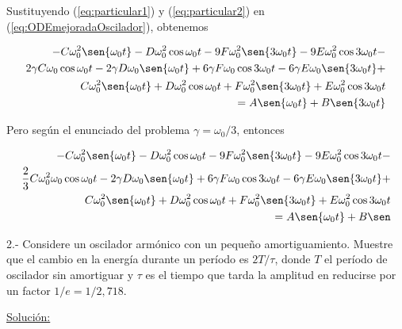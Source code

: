 \documentclass[a4paper,10pt]{article}
\begin{document}
Sustituyendo (\ref{eq:particular1}) y (\ref{eq:particular2}) en (\ref{eq:ODEmejoradaOscilador}),
obtenemos

\begin{align*}
%
 - C\omega_0^2 \sen{\omega_0t} - D\omega_0^2 \cos{\omega_0t} - 
  9F\omega_0^2 \sen{3 \omega_0t} - 9E\omega_0^2 \cos{3 \omega_0t} - \\
  2\gamma C \omega_0 \cos{\omega_0t} - 2\gamma D\omega_0 \sen{\omega_0t} + 
  6\gamma F\omega_0 \cos{3 \omega_0t} - 6\gamma E\omega_0 \sen{3 \omega_0t} + \\
  C\omega_0^2 \sen{\omega_0t} + D\omega_0^2 \cos{\omega_0t} + F\omega_0^2 
  \sen{3 \omega_0t} + E\omega_0^2 \cos{3 \omega_0t} \\
  = A \sen{\omega_0t} + B \sen{3\omega_0t}
\end{align*}

Pero según el enunciado del problema $\gamma = \omega_0/3$, entonces

\begin{align}
 \begin{split}
- C\omega_0^2 \sen{\omega_0t} - D\omega_0^2 \cos{\omega_0t} - 
  9F\omega_0^2 \sen{3 \omega_0t} - 9E\omega_0^2 \cos{3 \omega_0t} - \\
  \frac{2}{3} C \omega_0^2 \omega_0 \cos{\omega_0t} - 2\gamma D\omega_0 \sen{\omega_0t} + 
  6\gamma F\omega_0 \cos{3 \omega_0t} - 6\gamma E\omega_0 \sen{3 \omega_0t} + \\
  C\omega_0^2 \sen{\omega_0t} + D\omega_0^2 \cos{\omega_0t} + F\omega_0^2 
  \sen{3 \omega_0t} + E\omega_0^2 \cos{3 \omega_0t} \\
  = A \sen{\omega_0t} + B \sen
  \end{split}
\end{align}










\vspace{.3cm}

2.- Considere un oscilador armónico con un pequeño amortiguamiento.
Muestre que el cambio en la energía durante un período es $2T/\tau$,
donde $T$ el período de oscilador sin amortiguar y $\tau$ es el tiempo
que tarda la amplitud en reducirse por un factor $1/e=1/2,718$.

\vspace{.3cm}

\underline{Solución:} \vspace{.3cm}
\end{document}

